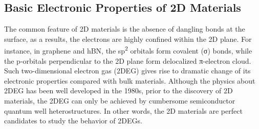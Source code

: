 \subsection{Basic Electronic Properties of 2D Materials}
\label{sec:basic-electr-prop}

The common feature of 2D materials is the absence of dangling bonds at
the surface, as a results, the electrons are highly confined within
the 2D plane.
%
For instance, in graphene and hBN, the sp\textsuperscript{2} orbitals
form covalent (σ) bonds, while the p-orbitals perpendicular to the 2D
plane form delocalized π-electron cloud.
%
Such two-dimensional
electron gas (2DEG) gives rise to dramatic change of its electronic
properties compared with bulk materials.
%
Although the physics about 2DEG has been well developed in the 1980s,
prior to the discovery of 2D materials, the 2DEG can only be achieved
by cumbersome semiconductor quantum well heterostructures. In other
words, the 2D materials are perfect candidates to study the behavior
of 2DEGs. 

